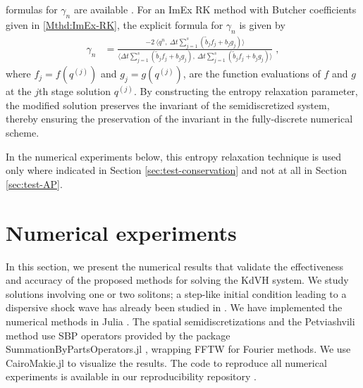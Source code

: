 \documentclass{article}
\begin{document}
formulas for $\gamma_n$ are available \cite{ketcheson2019relaxation,ranocha2020general}.
For an ImEx RK method with Butcher coefficients given in \eqref{Mthd:ImEx-RK}, the explicit formula for $\gamma_n$ is given by
\begin{align}
    \gamma_n & = \frac{-2 \  \langle q^n, \ \Delta t \sum_{j=1}^{s} (\tilde{b}_j f_j + b_j g_j)   \rangle}{\langle\Delta t \sum_{j=1}^{s} (\tilde{b}_j f_j + b_j g_j), \ \Delta t \sum_{j=1}^{s} (\tilde{b}_j f_j + b_j g_j)  \rangle} \;,
\end{align}
where $f_j = f(q^{(j)})$ and $g_j = g(q^{(j)})$, are the function evaluations of $f$ and $g$ at the $j$th stage solution $q^{(j)}$.
By constructing the entropy relaxation parameter,
the modified solution preserves the invariant of the semidiscretized system, thereby ensuring the preservation of
the invariant in the fully-discrete numerical scheme.

In the numerical experiments below, this entropy relaxation technique is used only
where indicated in Section \ref{sec:test-conservation} and not at all in Section \ref{sec:test-AP}.

\section{Numerical experiments} \label{sec:experiments}

In this section, we present the numerical results that validate the effectiveness and accuracy
of the proposed methods for solving the KdVH system.
We study solutions involving one or two solitons;
a step-like initial condition leading to a dispersive
shock wave has already been studied in \cite{besse2022perfectly}.
We have implemented the numerical methods in Julia \cite{bezanson2017julia}.
The spatial semidiscretizations and the Petviashvili method
use SBP operators provided by the package
SummationByPartsOperators.jl \cite{ranocha2021sbp}, wrapping
FFTW \cite{frigo2005design} for Fourier methods.
We use CairoMakie.jl \cite{danisch2021makie} to visualize the results.
The code to reproduce all numerical experiments is available in
our reproducibility repository \cite{biswas2024travelingRepro}.



\end{document}
